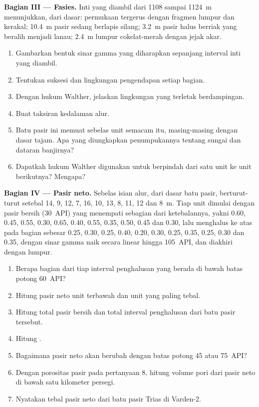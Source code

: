 \begin{problem}
\medskip\noindent\textbf{Bagian III --- Fasies.} Inti yang diambil dari 1108 sampai
\qty{1124}{m} menunjukkan, dari dasar: permukaan tergerus dengan fragmen lumpur dan
kerakal; \qty{10.4}{m} pasir sedang berlapis silang; \qty{3.2}{m} pasir
halus berriak yang beralih menjadi lanau; \qty{2.4}{m} lumpur cokelat-merah dengan jejak akar.
\begin{enumerate}[resume]
\item Gambarkan bentuk sinar gamma yang diharapkan sepanjang interval inti yang diambil.
\item Tentukan suksesi dan lingkungan pengendapan setiap bagian.
\item Dengan hukum Walther, jelaskan lingkungan yang terletak berdampingan.
\item Buat taksiran kedalaman alur.
\item Batu pasir ini memuat sebelas unit semacam itu, masing-masing dengan dasar tajam. Apa
  yang diungkapkan penumpukannya tentang sungai dan dataran banjirnya?
\item Dapatkah hukum Walther digunakan untuk berpindah dari satu unit ke unit berikutnya? Mengapa?
\end{enumerate}

\medskip\noindent\textbf{Bagian IV --- Pasir neto.} Sebelas isian alur,
dari dasar batu pasir, berturut-turut setebal 14, 9, 12, 7, 16, 10, 13, 8, 11, 12 dan
\qty{8}{m}. Tiap unit dimulai dengan pasir bersih (\qty{30}{API}) yang menempati
sebagian dari ketebalannya, yakni 0.60, 0.45, 0.55, 0.30, 0.65, 0.40, 0.55, 0.35, 0.50,
0.45 dan 0.30, lalu menghalus ke atas pada bagian sebesar 0.25, 0.30, 0.25, 0.40,
0.20, 0.30, 0.25, 0.35, 0.25, 0.30 dan 0.35, dengan sinar gamma naik secara linear hingga
\qty{105}{API}, dan diakhiri dengan lumpur.
\begin{enumerate}[resume]
\item Berapa bagian dari tiap interval penghalusan yang berada di bawah
  batas potong \qty{60}{API}?
\item Hitung pasir neto unit terbawah dan unit yang paling tebal.
\item Hitung total pasir bersih dan total interval penghalusan dari
  batu pasir tersebut.
\item Hitung .
\item Bagaimana pasir neto akan berubah dengan batas potong 45 atau
  \qty{75}{API}?
\item Dengan porositas pasir pada pertanyaan 8, hitung volume pori dari pasir neto
  di bawah satu kilometer persegi.
\item Nyatakan tebal pasir neto dari batu pasir Trias di Varden-2.
\end{enumerate}
\end{problem}
